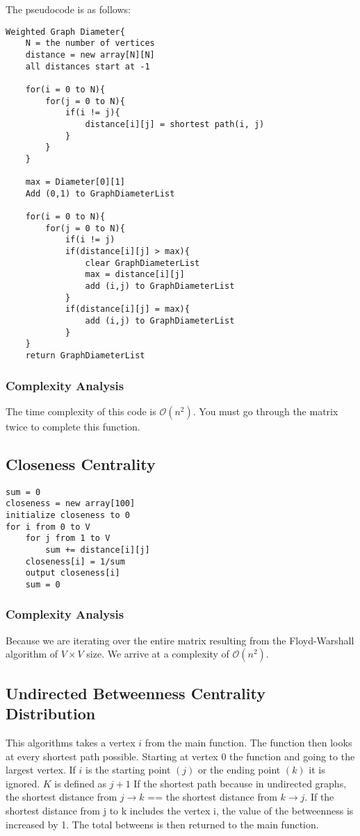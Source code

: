 \documentclass{article}
\begin{document}
The pseudocode is as follows:

\begin{verbatim}
Weighted Graph Diameter{
    N = the number of vertices
    distance = new array[N][N]
    all distances start at -1

    for(i = 0 to N){
        for(j = 0 to N){
            if(i != j){
                distance[i][j] = shortest path(i, j)
            }
        }
    }

    max = Diameter[0][1]
    Add (0,1) to GraphDiameterList

    for(i = 0 to N){
        for(j = 0 to N){
            if(i != j)
            if(distance[i][j] > max){
                clear GraphDiameterList
                max = distance[i][j]
                add (i,j) to GraphDiameterList
            }
            if(distance[i][j] = max){
                add (i,j) to GraphDiameterList
            }
    }
    return GraphDiameterList
\end{verbatim}

\subsubsection{Complexity Analysis}
The time complexity of this code is $\mathcal{O}(n^2)$. You must go through the matrix twice to complete this function.

\subsection{Closeness Centrality}
\begin{verbatim}
sum = 0
closeness = new array[100]
initialize closeness to 0
for i from 0 to V
    for j from 1 to V
        sum += distance[i][j]
    closeness[i] = 1/sum
    output closeness[i]
    sum = 0
\end{verbatim}

\subsubsection{Complexity Analysis}
Because we are iterating over the entire matrix resulting from the Floyd-Warshall algorithm of $V \times V$ size. We arrive at a complexity of $\mathcal{O}(n^2)$.

\subsection{Undirected Betweenness Centrality Distribution}
This algorithms takes a vertex $i$ from the main function. The function then looks at every shortest path possible. Starting at vertex $0$ the function and going to the largest vertex. If $i$ is the starting point $(j)$ or the ending point $(k)$ it is ignored. $K$ is defined as $j + 1$ If the shortest path because in undirected graphs, the shortest distance from $j \rightarrow k$ == the shortest distance from $k \rightarrow j$. If the shortest distance from j to k includes the vertex i, the value of the betweenness is increased by 1. The total betweens is then returned to the main function.
\end{document}

